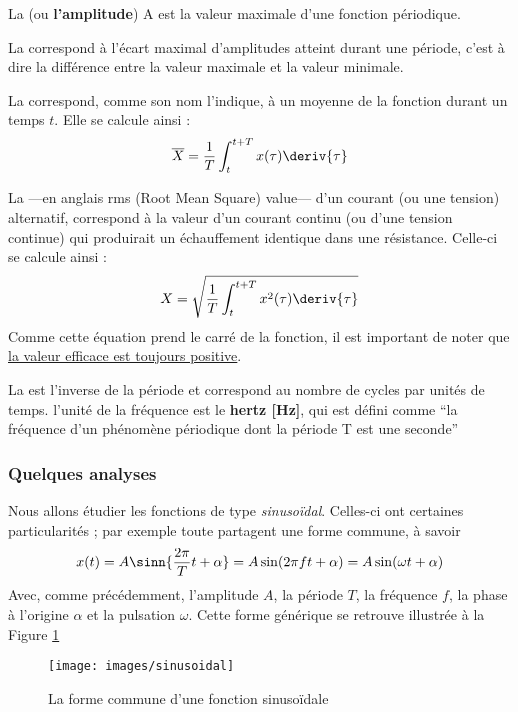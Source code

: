 \documentclass[12pt,a4paper]{article}
\begin{document}
La  (ou \textbf{l'amplitude}) A est la valeur maximale d'une fonction périodique.

La  correspond à l'écart maximal d'amplitudes atteint durant une période, c'est à dire la différence entre la valeur maximale et la valeur minimale.

La  correspond, comme son nom l'indique, à un moyenne de la fonction durant un temps $t$. Elle se calcule ainsi :
\begin{equation}
	\overline{X} = \frac{1}{T}\int_t^{t+T} x(\tau) \deriv{\tau}	
	\label{equ: valeur moyenne}
\end{equation}

La  ---en anglais rms (Root Mean Square) value--- d'un courant (ou une tension) alternatif, correspond à la valeur d'un courant continu (ou d'une tension continue) qui produirait un échauffement identique dans une résistance. Celle-ci se calcule ainsi :
\begin{equation}
	X = \sqrt{\frac{1}{T}\int_t^{t+T} x^2(\tau) \deriv{\tau}}
\end{equation} 
Comme cette équation prend le carré de la fonction, il est important de noter que \uline{la valeur efficace est toujours positive}.

La  est l'inverse de la période et correspond au nombre de cycles par unités de temps. l'unité de la fréquence est le \textbf{hertz [Hz]}, qui est défini comme ``la fréquence d'un phénomène périodique dont la période T est une seconde''
\subsubsection{Quelques analyses}
Nous allons étudier les fonctions de type \textit{sinusoïdal}. Celles-ci ont certaines particularités ; par exemple toute partagent une forme commune, à savoir 
\begin{equation}
	x(t) = A\sinn{\frac{2\pi}{T}t + \alpha} = A\sin(2\pi ft + \alpha) = A\sin(\omega t + \alpha)
\end{equation}
Avec, comme précédemment, l'amplitude $A$, la période $T$, la fréquence $f$, la phase à l'origine $\alpha$ et {la pulsation} $\omega$. Cette forme générique se retrouve illustrée à la Figure \ref{fig: generique sinusoidal}
\begin{figure}
	\centering
	\texttt{[image: images/sinusoidal]}
	\caption{La forme commune d'une fonction sinusoïdale}
	\label{fig: generique sinusoidal}
\end{figure}
\end{document}
